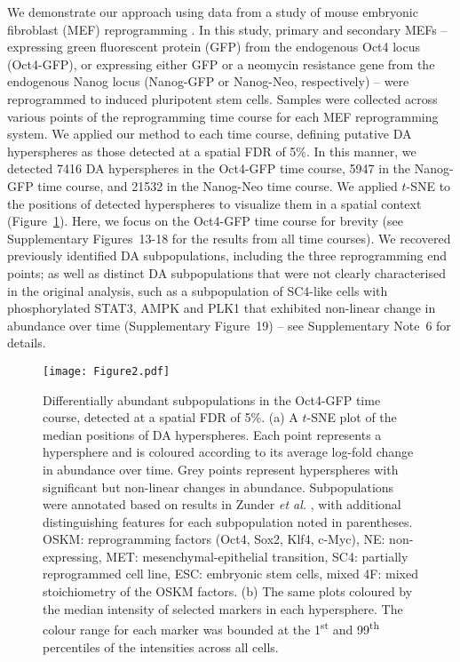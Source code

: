 \documentclass{article}
\newcommand{\suppsecmef}{6}
\newcommand{\suppfigrealextra}{13-18}
\newcommand{\suppfignonlinear}{19}
\begin{document}
We demonstrate our approach using data from a study of mouse embryonic fibroblast (MEF) reprogramming \cite{zunder2015continuous}.
In this study, primary and secondary MEFs 
-- expressing green fluorescent protein (GFP) from the endogenous Oct4 locus (Oct4-GFP),
or expressing either GFP or a neomycin resistance gene from the endogenous Nanog locus (Nanog-GFP or Nanog-Neo, respectively) -- 
were reprogrammed to induced pluripotent stem cells.
Samples were collected across various points of the reprogramming time course for each MEF reprogramming system.
We applied our method to each time course, defining putative DA hyperspheres as those detected at a spatial FDR of 5\%.
In this manner, we detected 7416 DA hyperspheres in the Oct4-GFP time course, 5947 in the Nanog-GFP time course, and 21532 in the Nanog-Neo time course.
We applied $t$-SNE \cite{van2008visualizing} to the positions of detected hyperspheres to visualize them in a spatial context (Figure~\ref{fig:oct4}).
Here, we focus on the Oct4-GFP time course for brevity (see Supplementary Figures~\suppfigrealextra{} for the results from all time courses).
We recovered previously identified DA subpopulations, including the three reprogramming end points; as well as distinct DA subpopulations that were not clearly characterised in the original analysis, such as a subpopulation of SC4-like cells with phosphorylated STAT3, AMPK and PLK1 that exhibited non-linear change in abundance over time (Supplementary Figure~\suppfignonlinear{}) -- see Supplementary Note~\suppsecmef{} for details.

\begin{figure}[p]
    \begin{center}
    \texttt{[image: Figure2.pdf]}
\end{center}
    \caption{
        Differentially abundant subpopulations in the Oct4-GFP time course, detected at a spatial FDR of 5\%.
        (a) A $t$-SNE plot of the median positions of DA hyperspheres. 
        Each point represents a hypersphere and is coloured according to its average log-fold change in abundance over time.
        Grey points represent hyperspheres with significant but non-linear changes in abundance.
        Subpopulations were annotated based on results in Zunder \emph{et al.} \cite{zunder2015continuous}, with additional distinguishing features for each subpopulation noted in parentheses.
        OSKM: reprogramming factors (Oct4, Sox2, Klf4, c-Myc), NE: non-expressing, MET: mesenchymal-epithelial transition, SC4: partially reprogrammed cell line, ESC: embryonic stem cells, mixed 4F: mixed stoichiometry of the OSKM factors.
        (b) The same plots coloured by the median intensity of selected markers in each hypersphere.
        The colour range for each marker was bounded at the 1\textsuperscript{st} and 99\textsuperscript{th} percentiles of the intensities across all cells.
    }
    \label{fig:oct4}
\end{figure}
\end{document}
